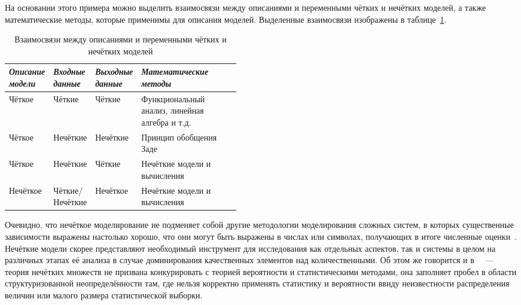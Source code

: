 На основании этого примера можно выделить взаимосвязи между описаниями и переменными чётких и нечётких моделей, а также математические методы, которые применимы для описания моделей. Выделенные взаимосвязи изображены в таблице~\ref{t:fuzzy-modeling-approaches}.
\begin{table}[h!]
\caption{Взаимосвязи между описаниями и переменными чётких и нечётких моделей}
\label{t:fuzzy-modeling-approaches}
\begin{center}
\begin{tabularx}{\textwidth}{|p{0.15\linewidth}|p{0.15\linewidth}|p{0.15\linewidth}|X|}
	\hline
		\centering \textit{Описание модели} & \centering \textit{Входные данные} & \centering \textit{Выходные данные} & \centering \textit{Математические методы} \tabularnewline	\hline
	\hline
		Чёткое & Чёткие & Чёткие & Функциональный анализ, линейная алгебра и т.д. \tabularnewline
	\hline
		Чёткое & Нечёткие & Нечёткие & Принцип обобщения Заде \tabularnewline
	\hline
		Чёткое & Нечёткие & Чёткие & Нечёткие модели и вычисления \tabularnewline
	\hline
		Нечёткое & Чёткие/\allowbreak Нечёткие & Нечёткое & Нечёткие модели и вычисления \tabularnewline
  \hline
\end{tabularx}
\end{center}
\end{table}

Очевидно, что нечёткое моделирование не подменяет собой другие методологии моделирования сложных систем, в которых существенные зависимости выражены настолько хорошо, что они могут быть выражены в числах или символах, получающих в итоге численные оценки~\cite{Borisov_Fedulov}. Нечёткие модели скорее представляют необходимый инструмент для исследования как отдельных аспектов, так и системы в целом на различных этапах её анализа в случае доминирования качественных элементов над количественными. Об этом же говорится и в~\cite{Kaufmann, Borisov_Alexeev_Msk} ~--- теория нечётких множеств не призвана конкурировать с теорией вероятности и статистическими методами, она заполняет пробел в области структуризованной неопределённости там, где нельзя корректно применять статистику и вероятности ввиду неизвестности распределения величин или малого размера статистической выборки.


